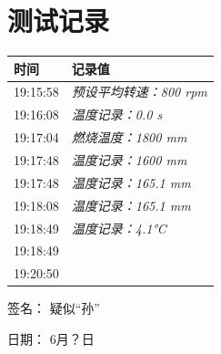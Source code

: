 \documentclass[UTF8,10pt,a4paper,fontset=fandol]{ctexart}
\newcommand{\fieldvalue}[1]{#1}
\newcommand{\handwritten}[1]{#1}
\begin{document}
\newpage

\section*{测试记录}

\begin{tabularx}{\textwidth}{@{}lX@{}}
时间 & 记录值 \\
\hline
\fieldvalue{19:15:58} & \textit{预设平均转速：800 rpm} \\

\fieldvalue{19:16:08} & \textit{温度记录：0.0 s} \\

\fieldvalue{19:17:04} & \textit{燃烧温度：1800 mm} \\

\fieldvalue{19:17:48} & \textit{温度记录：1600 mm} \\

\fieldvalue{19:17:48} & \textit{温度记录：165.1 mm} \\

\fieldvalue{19:18:08} & \textit{温度记录：165.1 mm} \\

\fieldvalue{19:18:49} & \textit{温度记录：4.1°C} \\

\fieldvalue{19:18:49} & \\

\fieldvalue{19:20:50} & \\
\end{tabularx}

\vspace{1em}

\noindent
签名：
\fieldvalue{\handwritten{疑似“孙”}}

\medskip

\noindent
日期：
\fieldvalue{\handwritten{6月？日}}

\vspace{1em}
\end{document}
